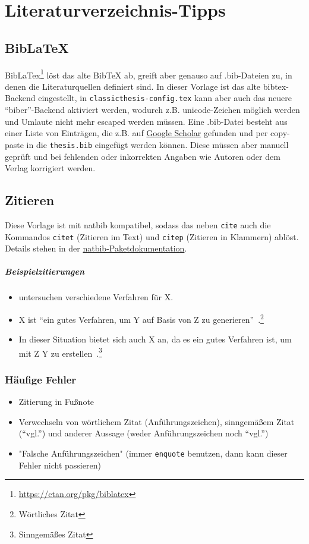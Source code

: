 \chapter{Literaturverzeichnis-Tipps}

\section{BibLaTeX}
BibLaTex\footnote{\url{https://ctan.org/pkg/biblatex}} löst das alte BibTeX ab, greift aber genauso auf .bib-Dateien zu, in denen die Literaturquellen definiert sind. In dieser Vorlage ist das alte bibtex-Backend eingestellt, in \texttt{classicthesis-config.tex} kann aber auch das neuere \enquote{biber}-Backend aktiviert werden, wodurch z.B. unicode-Zeichen möglich werden und Umlaute nicht mehr escaped werden müssen.
Eine .bib-Datei besteht aus einer Liste von Einträgen, die z.B. auf \href{https://scholar.google.com}{Google Scholar} gefunden und per copy-paste in die \texttt{thesis.bib} eingefügt werden können.
Diese müssen aber manuell geprüft und bei fehlenden oder inkorrekten Angaben wie Autoren oder dem Verlag korrigiert werden.

\section{Zitieren}
Diese Vorlage ist mit natbib kompatibel, sodass das neben \texttt{cite} auch die Kommandos \texttt{citet} (Zitieren im Text) und \texttt{citep} (Zitieren in Klammern) ablöst.
Details stehen in der \href{http://mirrors.ctan.org/macros/latex/contrib/natbib/natbib.pdf}{natbib-Paketdokumentation}.

\paragraph{Beispielzitierungen}
\begin{itemize}
\item \citet{sniktec} untersuchen verschiedene Verfahren für X.
\item X ist \enquote{ein gutes Verfahren, um Y auf Basis von Z zu generieren}~\citep{sniktec}.\footnote{Wörtliches Zitat}
\item In dieser Situation bietet sich auch X an, da es ein gutes Verfahren ist, um mit Z Y zu erstellen~\citep[vgl.]{sniktec}.\footnote{Sinngemäßes Zitat}
\end{itemize}


\subsection{Häufige Fehler}
\begin{itemize}
\item Zitierung in Fußnote
\item Verwechseln von wörtlichem Zitat (Anführungszeichen), sinngemäßem Zitat (\enquote{vgl.}) und anderer Aussage (weder Anführungszeichen noch \enquote{vgl.})
\item "Falsche Anführungszeichen" (immer \texttt{enquote} benutzen, dann kann dieser Fehler nicht passieren)
\end{itemize}

